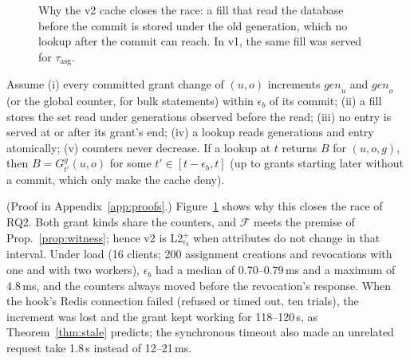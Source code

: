 \documentclass[sigconf,review,anonymous]{acmart}
\begin{document}
\begin{figure}[t]
\centering
{}
\caption{Why the v2 cache closes the race: a fill that read the database before the commit is stored under the
old generation, which no lookup after the commit can reach. In v1, the same fill was served for $\tau_{\mathrm{asg}}$.}
\label{fig:cache}
\end{figure}

\begin{proposition}\label{prop:fresh}
Assume (i) every committed grant change of $(u,o)$ increments $\mathit{gen}_u$ and $\mathit{gen}_o$ (or the global
counter, for bulk statements) within $\epsilon_b$ of its commit; (ii) a fill stores the set read under generations
observed before the read; (iii) no entry is served at or after its grant's end; (iv) a lookup reads generations and
entry atomically; (v) counters never decrease. If a lookup at $t$ returns $B$ for $(u,o,g)$, then $B=G^g_{t'}(u,o)$
for some $t'\in[t-\epsilon_b,t]$ (up to grants starting later without a commit, which only make the cache deny).
\end{proposition}
(Proof in Appendix~\ref{app:proofs}.)
\noindent Figure~\ref{fig:cache} shows why this closes the race of RQ2. Both grant kinds share the counters, and $\mathcal{F}$ meets the premise of
Prop.~\ref{prop:witness}; hence v2 is L2$^+_{\epsilon_b}$ when attributes do not change in that interval.
Under load (16 clients; 200 assignment creations and revocations with one and with two workers), $\epsilon_b$ had a median of 0.70--0.79\,ms and a maximum of
4.8\,ms, and the counters always moved before the revocation's response. When the hook's Redis connection failed (refused or timed out,
ten trials), the increment was lost and the grant kept working for 118--120\,s, as Theorem~\ref{thm:stale} predicts;
the synchronous timeout also made an unrelated request take 1.8\,s instead of 12--21\,ms.
\end{document}
